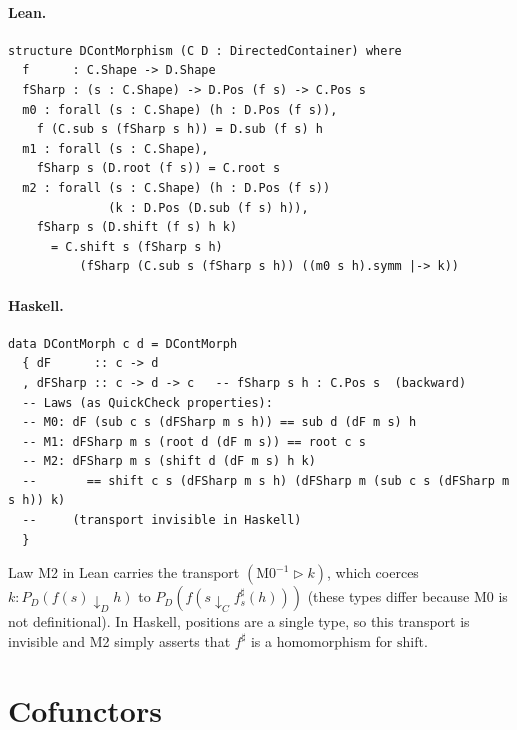 \documentclass[11pt,a4paper]{article}
\begin{document}
\paragraph{Lean.}
\begin{lstlisting}[style=lean]
structure DContMorphism (C D : DirectedContainer) where
  f      : C.Shape -> D.Shape
  fSharp : (s : C.Shape) -> D.Pos (f s) -> C.Pos s
  m0 : forall (s : C.Shape) (h : D.Pos (f s)),
    f (C.sub s (fSharp s h)) = D.sub (f s) h
  m1 : forall (s : C.Shape),
    fSharp s (D.root (f s)) = C.root s
  m2 : forall (s : C.Shape) (h : D.Pos (f s))
              (k : D.Pos (D.sub (f s) h)),
    fSharp s (D.shift (f s) h k)
      = C.shift s (fSharp s h)
          (fSharp (C.sub s (fSharp s h)) ((m0 s h).symm |-> k))
\end{lstlisting}

\paragraph{Haskell.}
\begin{lstlisting}[style=haskell]
data DContMorph c d = DContMorph
  { dF      :: c -> d
  , dFSharp :: c -> d -> c   -- fSharp s h : C.Pos s  (backward)
  -- Laws (as QuickCheck properties):
  -- M0: dF (sub c s (dFSharp m s h)) == sub d (dF m s) h
  -- M1: dFSharp m s (root d (dF m s)) == root c s
  -- M2: dFSharp m s (shift d (dF m s) h k)
  --       == shift c s (dFSharp m s h) (dFSharp m (sub c s (dFSharp m s h)) k)
  --     (transport invisible in Haskell)
  }
\end{lstlisting}

\begin{fidelitynote}
Law M2 in Lean carries the transport $(\mathrm{M0}^{-1} \triangleright k)$,
which coerces $k : P_D(f(s) \downarrow_D h)$ to $P_D(f(s \downarrow_C
f^\sharp_s(h)))$ (these types differ because M0 is not definitional).  In
Haskell, positions are a single type, so this transport is invisible and M2
simply asserts that $f^\sharp$ is a homomorphism for $\mathrm{shift}$.
\end{fidelitynote}


\section{Cofunctors}

\end{document}
